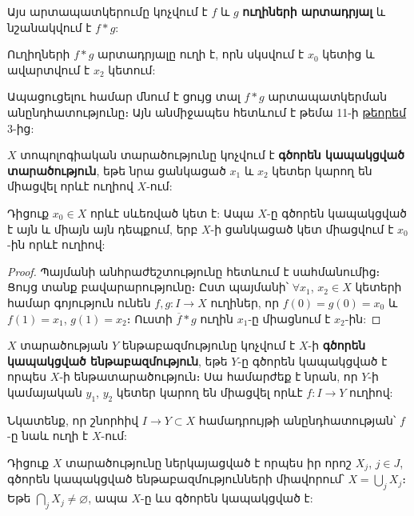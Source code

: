 \documentclass[./main.tex]{subfiles}
\begin{document}
\par Այս արտապատկերումը կոչվում է $f$ և $g$ \textbf{ուղիների արտադրյալ} և նշանակվում է $f*g$:

\begin{theorem}\label{ch15thm1} 
Ուղիղների $f*g$ արտադրյալը ուղի է, որն սկսվում է $x_0$ կետից և ավարտվում է $x_2$ կետում:
\end{theorem}
	
\par Ապացուցելու համար մնում է ցույց տալ $f*g$ արտապատկերման ան\-ընդ\-հա\-տու\-թյու\-նը։ Այն անմիջապես հետևում է թեմա 11-ի \hyperref[ch11thm3]{թեորեմ $3$}-ից:

\begin{definition}
$X$ տոպոլոգիական տարածությունը կոչվում է \textbf{գծորեն կապակցված տարածություն}, եթե նրա ցանկացած $x_1$ և $x_2$ կետեր կարող են միացվել որևէ ուղիով $X$-ում:
\end{definition}

\begin{theorem}\label{ch15thm2}
Դիցուք $x_0 \in X$ որևէ սևեռված կետ է: Ապա $X$-ը գծորեն կապակցված է այն և միայն այն դեպքում, երբ $X$-ի ցանկացած կետ միացվում է $x_0$-ին որևէ ուղի\-ով:
\end{theorem}

\begin{proof}
Պայմանի անհրաժեշտությունը հետևում է սահմանումից։ Ցույց տանք բա\-վա\-րա\-րութ\-յու\-նը։ Ըստ պայմանի՝ $\forall x_1$, $x_2 \in X$ կետերի համար գոյություն ունեն $f,g :I \rightarrow X$ ուղիներ, որ $f(0) =g(0) =x_0$ և $f(1)=x_1$, $g(1)=x_2$։ Ուստի $\overline{f}*g$ ուղին $x_1$-ը միացնում է $x_2$-ին:
\end{proof}

\begin{definition}
$X$ տարածության $Y$ ենթաբազմությունը կոչվում է $X$-ի \textbf{գծորեն կա\-պակ\-ցված ենթաբազմություն}, եթե $Y$-ը գծորեն կապակցված է որպես $X$-ի են\-թա\-տարա\-ծութ\-յուն։ Սա համարժեք է նրան, որ $Y$-ի կամայական $y_1$, $y_2$ կետեր կարող են միաց\-վել որևէ $f :I \rightarrow Y$ ուղիով:
\end{definition}

Նկատենք, որ շնորհիվ $I \rightarrow Y \subset X$ համադրույթի անընդհատության՝ $f$-ը նաև ուղի է $X$-ում:

\begin{theorem}\label{ch15thm3} 
Դիցուք $X$ տարածությունը ներկայացված է որպես իր որոշ $X_j$, $j \in J$, գծորեն կապակցված ենթաբազմությունների միավորում՝ $X = \bigcup\limits_{j} X_j $։ Եթե ${\bigcap\limits_j X_j\neq \varnothing}$, ապա $X$-ը ևս գծորեն կապակցված է:
\end{theorem}
\end{document}
